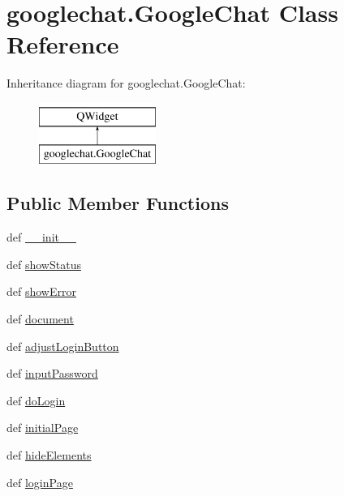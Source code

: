 \hypertarget{classgooglechat_1_1GoogleChat}{}\section{googlechat.\+Google\+Chat Class Reference}
\label{classgooglechat_1_1GoogleChat}
Inheritance diagram for googlechat.\+Google\+Chat\+:\begin{figure}[H]
\begin{center}
\leavevmode
\includegraphics[height=2.000000cm]{classgooglechat_1_1GoogleChat}
\end{center}
\end{figure}
\subsection*{Public Member Functions}
\begin{DoxyCompactItemize}
\item 
def \hyperlink{classgooglechat_1_1GoogleChat_a1188988bb3f6e493b76d3be1fb891fcc}{\+\_\+\+\_\+init\+\_\+\+\_\+}
\item 
def \hyperlink{classgooglechat_1_1GoogleChat_aa3077acbb800dea312ec0a1d07dd4b42}{show\+Status}
\item 
def \hyperlink{classgooglechat_1_1GoogleChat_a541b5bbc238ac42c0b756f97dc779eb5}{show\+Error}
\item 
def \hyperlink{classgooglechat_1_1GoogleChat_ab17a3768c135f9f933755a87d002085c}{document}
\item 
def \hyperlink{classgooglechat_1_1GoogleChat_a3a4ddcccd190ed2a7efd3eca6f3d97aa}{adjust\+Login\+Button}
\item 
def \hyperlink{classgooglechat_1_1GoogleChat_ae73e2969f2f51e597d9f0c5c9133251b}{input\+Password}
\item 
def \hyperlink{classgooglechat_1_1GoogleChat_a377cd598fb1174768615e833cfa001f7}{do\+Login}
\item 
def \hyperlink{classgooglechat_1_1GoogleChat_a5526d665223b1937b8bc8fda8f359a4c}{initial\+Page}
\item 
def \hyperlink{classgooglechat_1_1GoogleChat_a4f4a2e3ffd73f8dbbad4cb69aaaf7b3b}{hide\+Elements}
\item 
def \hyperlink{classgooglechat_1_1GoogleChat_a17f49effaaa24f28d4c7a7742ed787b7}{login\+Page}
\end{DoxyCompactItemize}
